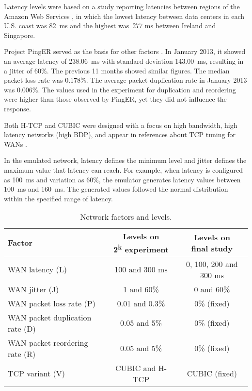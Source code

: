 \documentclass[man,floatsintext,12pt]{apa6}
\begin{document}
Latency levels were based on a study reporting latencies between regions of the
Amazon Web Services \parencite{Sovran2011}, in which the lowest latency between data
centers in each U.S. coast was 82~ms and the highest was~277 ms between Ireland
and Singapore.

Project PingER served as the basis for other factors \parencite{PingER2013}. In
January 2013, it showed an average latency of 238.06~ms with standard deviation
143.00~ms, resulting in a jitter of 60\%. The previous 11 months showed similar
figures. The median packet loss rate was 0.178\%. The average packet
duplication rate in January 2013 was 0.006\%. The values used in the experiment
for duplication and reordering were higher than those observed by PingER, yet
they did not influence the response.

Both H-TCP and CUBIC were designed with a focus on high bandwidth, high latency
networks (high BDP), and appear in references about TCP tuning for WANs
\parencite{ESnet2012}.

In the emulated network, latency defines the minimum level and jitter defines
the maximum value that latency can reach. For example, when latency is
configured as 100~ms and variation as 60\%, the emulator generates latency
values between 100~ms and 160~ms. The generated values followed the normal
distribution within the specified range of latency.

\begin{table}[h!]
\caption{Network factors and levels.}
\label{tab:network_factors_and_levels}
\begin{tabular}{lcc} \toprule
Factor & \thead{Levels on \\ 2\textsuperscript{k} experiment} & \thead{Levels on \\final study} \\ \midrule

WAN latency (L) & 100 and 300 ms & 0, 100, 200 and 300 ms\\

WAN jitter (J) & 1 and 60\% & 0 and 60\%\\

WAN packet loss rate (P) & 0.01 and 0.3\% & 0\% (fixed)\\

WAN packet duplication rate (D) & 0.05 and 5\% & 0\% (fixed) \\

WAN packet reordering rate (R) & 0.05 and 5\% & 0\% (fixed) \\

TCP variant (V) & CUBIC and H-TCP & CUBIC (fixed) \\ \bottomrule

\end{tabular}  
\end{table}
\end{document}
